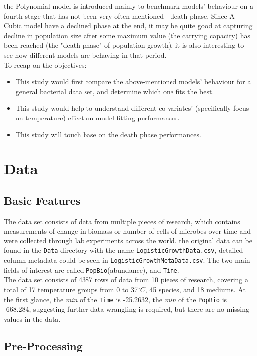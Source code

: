 \documentclass[11pt]{article}
\begin{document}
the Polynomial model is introduced mainly to benchmark models' behaviour on a fourth stage that has not been very often mentioned - death phase. Since A Cubic model have a declined phase at the end, it may be quite good at capturing decline in population size after some maximum value (the carrying capacity) has been reached (the "death phase" of population growth)\parencite{buchanan1918life}, it is also interesting to see how different models are behaving in that period.\\
To recap on the objectives:
\begin{itemize}
  \item This study would first compare the above-mentioned models' behaviour for a general bacterial data set, and determine which one fits the best.
  \item This study would help to understand different co-variates' (specifically focus on temperature) effect on model fitting performances.
  \item This study will touch base on the death phase performances.
\end{itemize}


\section{Data}
\subsection{Basic Features}
The data set consists of data from multiple pieces of research, which contains measurements of change in biomass or number of cells of microbes over time and were collected through lab experiments across the world. the original data can be found in the \verb|Data| directory with the name \verb|LogisticGrowthData.csv|, detailed column metadata could be seen in \verb|LogisticGrowthMetaData.csv|. The two main fields of interest are called \verb|PopBio|(abundance), and \verb|Time|.\\
The data set consists of 4387 rows of data from 10 pieces of research, covering a total of 17 temperature groups from 0 to 37$^\circ C$, 45 species, and 18 mediums. At the first glance, the \emph{min} of the \verb|Time| is -25.2632, the \emph{min} of the \verb|PopBio| is -668.284, suggesting further data wrangling is required, but there are no missing values in the data.
\subsection{Pre-Processing}
\end{document}
